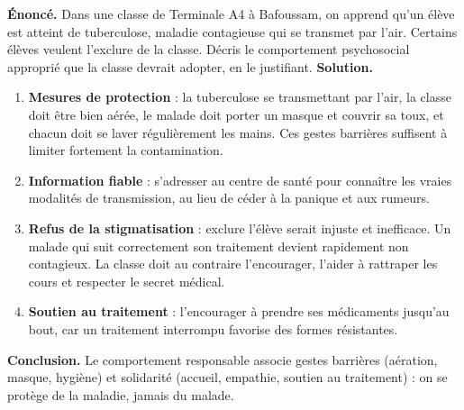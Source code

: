 \documentclass[11pt]{article}
\newcommand{\cle}[1]{{\popxbold\color{popdark}#1}}
\begin{document}
\begin{exoresolu}
\textbf{Énoncé.} Dans une classe de Terminale A4 à Bafoussam, on apprend qu'un élève est atteint de tuberculose, maladie contagieuse qui se transmet par l'air. Certains élèves veulent l'exclure de la classe. Décris le comportement psychosocial approprié que la classe devrait adopter, en le justifiant.
\tcblower
\textbf{Solution.}
\begin{enumerate}
\item \textbf{Mesures de protection} : la tuberculose se transmettant par l'air, la classe doit être bien \cle{aérée}, le malade doit porter un masque et couvrir sa toux, et chacun doit se laver régulièrement les mains. Ces gestes barrières suffisent à limiter fortement la contamination.
\item \textbf{Information fiable} : s'adresser au centre de santé pour connaître les vraies modalités de transmission, au lieu de céder à la panique et aux rumeurs.
\item \textbf{Refus de la stigmatisation} : exclure l'élève serait injuste et inefficace. Un malade qui suit correctement son traitement devient rapidement \cle{non contagieux}. La classe doit au contraire l'encourager, l'aider à rattraper les cours et respecter le secret médical.
\item \textbf{Soutien au traitement} : l'encourager à prendre ses médicaments jusqu'au bout, car un traitement interrompu favorise des formes résistantes.
\end{enumerate}
\textbf{Conclusion.} Le comportement responsable associe gestes barrières (aération, masque, hygiène) et solidarité (accueil, empathie, soutien au traitement) : on se protège de la maladie, jamais du malade.
\end{exoresolu}
\end{document}
